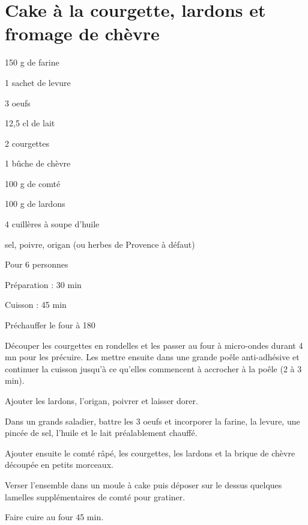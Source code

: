 \section[\normalsize{Cake \`a la courgette, lardons et fromage de ch\`evre}]{Cake \`a la courgette, lardons et fromage de ch\`evre}

\begin{ingredients}
\item 150 g de farine
\item 1 sachet de levure
\item 3 oeufs
\item 12,5 cl de lait
\item 2 courgettes
\item 1 bûche de ch\`evre
\item 100 g de comt\'e
\item 100 g de lardons
\item 4 cuill\`eres \`a soupe d'huile
\item sel, poivre, origan (ou herbes de Provence \`a d\'efaut)
\end{ingredients}
\begin{infos}
\item Pour 6 personnes
\item Préparation : 30 min
\item Cuisson : 45 min
\end{infos}
\begin{etapes}
\item Pr\'echauffer le four \`a 180
\item D\'ecouper les courgettes en rondelles et les passer au four \`a micro-ondes durant 4 mn pour les pr\'ecuire. Les mettre ensuite dans une grande po\^ele anti-adh\'esive et continuer la cuisson jusqu'\`a ce qu'elles commencent \`a accrocher \`a la po\^ele (2 \`a 3 min). 
\item Ajouter les lardons, l'origan, poivrer et laisser dorer.
\item Dans un grands saladier, battre les 3 oeufs et incorporer la farine, la levure, une pinc\'ee de sel, l'huile et le lait pr\'ealablement chauff\'e.
\item Ajouter ensuite le comt\'e r\^ap\'e, les courgettes, les lardons et la brique de ch\`evre d\'ecoup\'ee en petits morceaux. 
\item Verser l'ensemble dans un moule \`a cake puis d\'eposer sur le dessus quelques lamelles suppl\'ementaires de comt\'e pour gratiner.
\item Faire cuire au four 45 min.
\end{etapes}
\begin{conseils}
\end{conseils}

